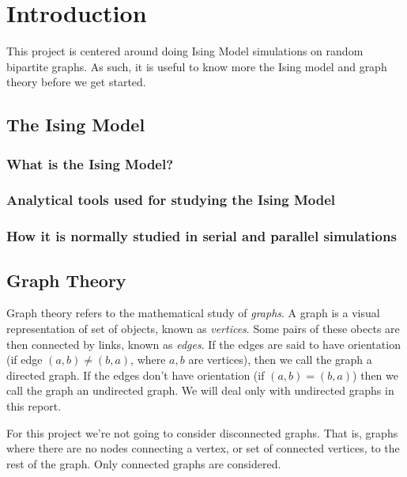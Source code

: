 \documentclass[pdftex,12pt,a4paper]{article}
\begin{document}
\section{Introduction}

This project is centered around doing Ising Model simulations on random bipartite graphs. As such, it is useful to know more the Ising model and graph theory before we get started.


\subsection{The Ising Model}

\subsubsection{What is the Ising Model?}

\subsubsection{Analytical tools used for studying the Ising Model}

\subsubsection{How it is normally studied in serial and parallel simulations}


\subsection{Graph Theory}

Graph theory refers to the mathematical study of \emph{graphs}. A graph is a visual representation of set of objects, known as \emph{vertices}. Some pairs of these obects are then connected by links, known as \emph{edges}. If the edges are said to have orientation (if edge $(a, b) \neq (b, a)$, where $a, b$ are vertices), then we call the graph a directed graph. If the edges don't have orientation (if $(a,b)=(b,a)$) then we call the graph an undirected graph. We will deal only with undirected graphs in this report.

For this project we're not going to consider disconnected graphs. That is, graphs where there are no nodes connecting a vertex, or set of connected vertices, to the rest of the graph. Only connected graphs are considered.
\end{document}
